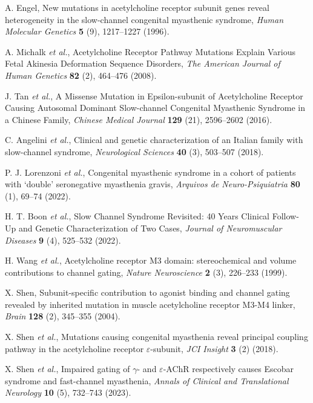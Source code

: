 A. Engel, New mutations in acetylcholine receptor subunit genes reveal heterogeneity in the slow-channel congenital myasthenic syndrome, {\em Human Molecular Genetics} {\bf 5} (9), 1217--1227 (1996).

A. Michalk {\em et al.}, Acetylcholine Receptor Pathway Mutations Explain Various Fetal Akinesia Deformation Sequence Disorders, {\em The American Journal of Human Genetics} {\bf 82} (2), 464--476 (2008).

J. Tan {\em et al.}, A Missense Mutation in Epsilon-subunit of Acetylcholine Receptor Causing Autosomal Dominant Slow-channel Congenital Myasthenic Syndrome in a Chinese Family, {\em Chinese Medical Journal} {\bf 129} (21), 2596--2602 (2016).

C. Angelini {\em et al.}, Clinical and genetic characterization of an Italian family with slow-channel syndrome, {\em Neurological Sciences} {\bf 40} (3), 503--507 (2018).

P. J. Lorenzoni {\em et al.}, Congenital myasthenic syndrome in a cohort of patients with `double' seronegative myasthenia gravis, {\em Arquivos de Neuro-Psiquiatria} {\bf 80} (1), 69--74 (2022).

H. T. Boon {\em et al.}, Slow Channel Syndrome Revisited: 40 Years Clinical Follow-Up and Genetic Characterization of Two Cases, {\em Journal of Neuromuscular Diseases} {\bf 9} (4), 525--532 (2022).

H. Wang {\em et al.}, Acetylcholine receptor M3 domain: stereochemical and volume contributions to channel gating, {\em Nature Neuroscience} {\bf 2} (3), 226--233 (1999).

X. Shen, Subunit-specific contribution to agonist binding and channel gating revealed by inherited mutation in muscle acetylcholine receptor M3-M4 linker, {\em Brain} {\bf 128} (2), 345--355 (2004).

X. Shen {\em et al.}, Mutations causing congenital myasthenia reveal principal coupling pathway in the acetylcholine receptor $\varepsilon$-subunit, {\em JCI Insight} {\bf 3} (2) (2018).

X. Shen {\em et al.}, Impaired gating of $\gamma$- and $\varepsilon$-AChR respectively causes Escobar syndrome and fast-channel myasthenia, {\em Annals of Clinical and Translational Neurology} {\bf 10} (5), 732--743 (2023).

